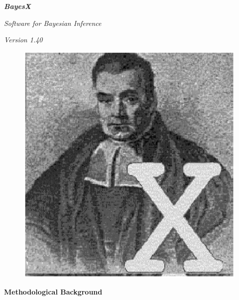 \documentclass[11pt,a4paper,twoside]{bayesxarticle}
\begin{document}
\MakeShortVerb{\#}

\thispagestyle{empty}

\begin{center}
{\bf \em \huge Bayes{\Huge X}}

\vspace{0.5cm}

{\em \large Software for Bayesian Inference}

\vspace{0.5cm}

{\em Version 1.40}

\vspace{0.5cm}

\begin{figure}[h]
\begin{center}
\includegraphics[scale=1.2]{grafiken/bayesicon.eps}
\end{center}
\end{figure}

\vfill

{\bf\sffamily \huge Methodological Background}

\vfill

\end{center}
\end{document}
